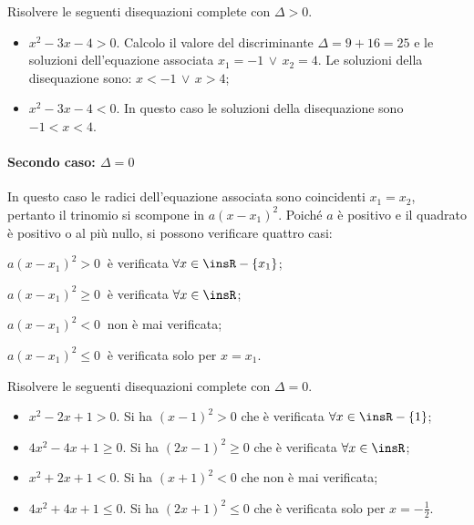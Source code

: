 \begin{exrig}
\begin{esempio}
Risolvere le seguenti disequazioni complete con $\Delta>0$.
\begin{itemize}
\item $x^2-3x-4>0$. Calcolo il valore del discriminante $\Delta =9+16=25$ e le soluzioni dell'equazione associata $x_1=-1\,\vee\,x_2=4$. Le soluzioni della disequazione sono: $x<-1\,\vee\,x>4$;
\item $x^2-3x-4<0$. In questo caso le soluzioni della disequazione sono $-1<x<4$.
\end{itemize}
\end{esempio}
\end{exrig}

\paragraph{Secondo caso: $\Delta =0$} In questo caso le radici dell'equazione associata sono coincidenti $x_1=x_2$, pertanto il trinomio si scompone in $a(x-x_1)^2$. Poiché $a$ è positivo e il quadrato è positivo o al più nullo, si possono verificare quattro casi:

\begin{itemize*}
\item $a(x-x_1)^2>0\:$ è verificata $\forall x\in \insR- \{x_1\}$;
\item $a(x-x_1)^2\ge 0\:$ è verificata $\forall x\in \insR$;
\item $a(x-x_1)^2<0\:$ non è mai verificata;
\item $a(x-x_1)^2\le 0\:$ è verificata solo per $x=x_1$.
\end{itemize*}

\begin{exrig}
\begin{esempio}
Risolvere le seguenti disequazioni complete con $\Delta=0$.
\begin{itemize}
\item $x^2-2x+1>0$. Si ha $(x-1)^2>0$ che è verificata $\forall x\in \insR - \{1\}$;
\item $4x^2-4x+1\ge 0$. Si ha $(2x-1)^2\ge 0$ che è verificata $\forall x\in \insR$;
\item $x^2+2x+1<0$. Si ha $(x+1)^2<0$ che non è mai verificata;
\item $4x^2+4x+1\le 0$. Si ha $(2x+1)^2\le 0$ che è verificata solo per $x=-\frac 1 2$.
\end{itemize}
\end{esempio}
\end{exrig}

